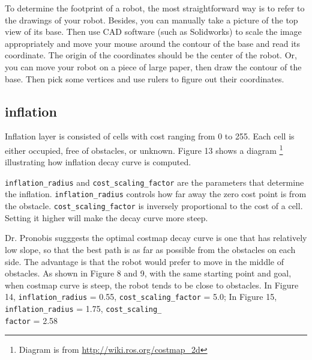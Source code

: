 \documentclass[12pt]{article}
\begin{document}
To determine the footprint of a robot, the most straightforward way is to refer to the drawings of your robot. Besides, you can manually take a picture of the top view of its base. Then use CAD software (such as Solidworks) to scale the image appropriately and move your mouse around the contour of the base and read its coordinate. The origin of the coordinates should be the center of the robot. Or, you can move your robot on a piece of large paper, then draw the contour of the base. Then pick some vertices and use rulers to figure out their coordinates.

\subsection{inflation} 
Inflation layer is consisted of cells with cost ranging from 0 to 255. Each cell is either occupied, free of obstacles, or unknown. Figure 13 shows a diagram \footnote{Diagram is from \url{http://wiki.ros.org/costmap_2d}} illustrating how inflation decay curve is computed.

\texttt{inflation\_radius} and \texttt{cost\_scaling\_factor} are the parameters that determine the inflation. \texttt{inflation\_radius} controls how far away the zero cost point is from the obstacle. \texttt{cost\_scaling\_factor} is inversely proportional to the cost of a cell. Setting it higher will make the decay curve more steep.

Dr. Pronobis sugggests the optimal costmap decay curve is one that has relatively low slope, so that the best path is as far as possible from the obstacles on each side. The advantage is that the robot would prefer to move in the middle of obstacles.  As shown in Figure 8 and 9, with the same starting point and goal, when costmap curve is steep, the robot tends to be close to obstacles. In Figure 14, \texttt{inflation\_radius} = 0.55, \texttt{cost\_scaling\_factor} = 5.0; In Figure 15, \texttt{inflation\_radius} = 1.75, \texttt{cost\_scaling\_\\factor} = 2.58
\end{document}
